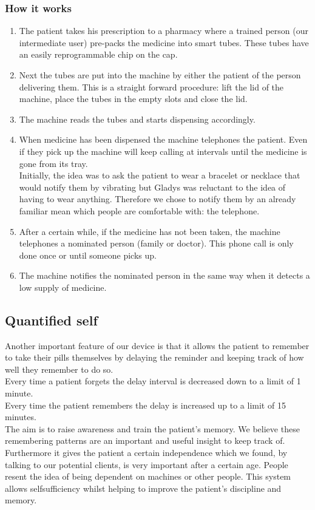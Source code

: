 \documentclass{article}
\begin{document}
	\subsubsection*{How it works}
	\begin{enumerate}
	\item The patient takes his prescription to a pharmacy where a trained person (our intermediate user) pre-packs the medicine into smart tubes. These tubes have an easily reprogrammable chip on the cap.
	\item Next the tubes are put into the machine by either the patient of the person delivering them. This is a straight forward procedure: lift the lid of the machine, place the tubes in the empty slots and close the lid.
	\item The machine reads the tubes and starts dispensing accordingly.
	\item When medicine has been dispensed the machine telephones the patient. Even if they pick up the machine will keep calling at intervals until the medicine is gone from its tray. \\ Initially, the idea was to ask the patient to wear a bracelet or necklace that would notify them by vibrating but Gladys was reluctant to the idea of having to wear anything. Therefore we chose to notify them by an already familiar mean which people are comfortable with: the telephone.
	\item After a certain while, if the medicine has not been taken, the machine telephones a nominated person (family or doctor). This phone call is only done once or until someone picks up.
	\item The machine notifies the nominated person in the same way when it detects a low supply of medicine.
	\end{enumerate}

	\subsection{Quantified self}
	Another important feature of our device is that it allows the patient to remember to take their pills themselves by delaying the reminder and keeping track of how well they remember to do so. \medskip \\
	Every time a patient forgets the delay interval is decreased down to a limit of 1 minute.\\
	Every time the patient remembers the delay is increased up to a limit of 15 minutes.\medskip \\
	The aim is to raise awareness and train the patient's memory. We believe these remembering patterns are an important and useful insight to keep track of. Furthermore it gives the patient a certain independence which we found, by talking to our potential clients, is very important after a certain age. People resent the idea of being dependent on machines or other people. This system allows selfsufficiency whilst helping to improve the patient's discipline and memory.
	
\end{document}
